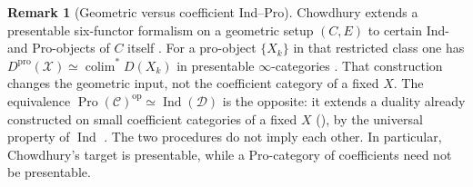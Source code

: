 \documentclass[11pt]{amsart}
\newcommand{\cC}{\mathcal{C}}
\newcommand{\cD}{\mathcal{D}}
\newcommand{\op}{{\operatorname{op}}}
\newcommand{\Pro}{\operatorname{Pro}}
\newcommand{\Ind}{\operatorname{Ind}}
\theoremstyle{plain}
\theoremstyle{definition}
\newtheorem{remark}[remark]{Remark}
\numberwithin{equation}{section}
\begin{document}
\begin{remark}[Geometric versus coefficient Ind--Pro]\label{rem:chow-indpro}
Chowdhury extends a presentable six-functor formalism on a geometric setup $(C,E)$ to certain Ind- and Pro-objects of $C$ itself \cite[Definitions 4.1.6 and 4.1.8; Theorem 4.2.1]{Chow-IndPro}.
For a pro-object $\{X_k\}$ in that restricted class one has $D^{\mathrm{pro}}(\mathcal X)\simeq\operatorname{colim}^* D(X_k)$ in presentable $\infty$-categories \cite[Remark 4.2.2(2)]{Chow-IndPro}.
That construction changes the geometric input, not the coefficient category of a fixed $X$.
The equivalence $\Pro(\cC)^{\op}\simeq\Ind(\cD)$ is the opposite: 
it extends a duality already constructed on small coefficient categories of a fixed $X$ (), by the universal property of $\Ind$ \cite[Proposition 5.3.5.10]{HTT}.
The two procedures do not imply each other.
In particular, Chowdhury's target is presentable, while a Pro-category of coefficients need not be presentable.
\end{remark}
\end{document}
